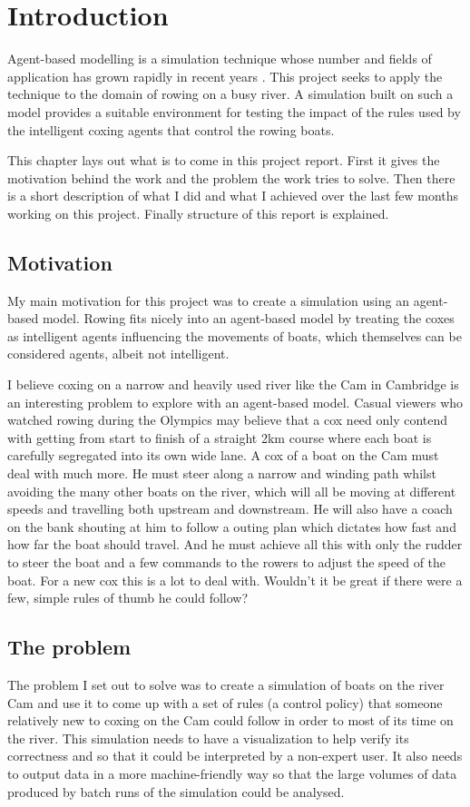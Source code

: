 \chapter{Introduction}\label{chapter:intro}
  Agent-based modelling is a simulation technique whose number and fields of application has grown rapidly in recent years \cite{Bonabeau2002, Miller2010, Chen2010, Helbing2000}. This project seeks to apply the technique to the domain of rowing on a busy river. A simulation built on such a model provides a suitable environment for testing the impact of the rules used by the intelligent coxing agents that control the rowing boats.

  This chapter lays out what is to come in this project report. First it gives the motivation behind the work and the problem the work tries to solve. Then there is a short description of what I did and what I achieved over the last few months working on this project. Finally structure of this report is explained.

  \section{Motivation}
  My main motivation for this project was to create a simulation using an agent-based model. Rowing fits nicely into an agent-based model by treating the coxes as intelligent agents influencing the movements of boats, which themselves can be considered agents, albeit not intelligent.

  I believe coxing on a narrow and heavily used river like the Cam in Cambridge is an interesting problem to explore with an agent-based model. Casual viewers who watched rowing during the Olympics may believe that a cox need only contend with getting from start to finish of a straight 2km course where each boat is carefully segregated into its own wide lane.
  A cox of a boat on the Cam must deal with much more. He must steer along a narrow and
  winding path whilst avoiding the many other boats on the river, which will all be moving at different speeds and travelling both upstream and downstream. He will also
  have a coach on the bank shouting at him to follow a outing plan
  which dictates how fast and how far the boat should travel. And he
  must achieve all this with only the rudder to steer the boat and a few commands to the rowers to adjust the speed of the boat. For a new cox this is a lot to deal with. Wouldn't it be great if there were a few, simple rules of thumb he could follow?
  
  \section{The problem}
  The problem I set out to solve was to create a simulation of boats on the river Cam and use it to come up with a set of rules (a control policy) that someone relatively new to coxing on the Cam could follow in order to most of its time on the river. This simulation needs to have a visualization to help verify its correctness and so that it could be interpreted by a non-expert user. It also needs to output data in a more machine-friendly way so that the large volumes of data produced by batch runs of the simulation could be analysed.
  
